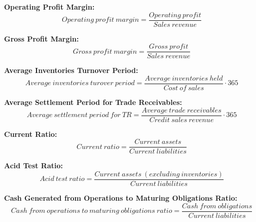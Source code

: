 \documentclass{report}
\newenvironment{blackbox}[1][Black]
  {\begin{tcolorbox}[colframe=#1,colback=white]}
  {\end{tcolorbox}}
\begin{document}
\begin{blackbox}
    \textbf{Operating Profit Margin:}
    \begin{equation}
        Operating \: profit \: margin = \frac{Operating \: profit}{Sales \: revenue}
    \end{equation}
\end{blackbox}

\begin{blackbox}
    \textbf{Gross Profit Margin:}
    \begin{equation}
        Gross \: profit \: margin = \frac{Gross \: profit}{Sales \: revenue}
    \end{equation}
\end{blackbox}

\begin{blackbox}
    \textbf{Average Inventories Turnover Period:}
    \begin{equation}
        Average \: inventories \: turover \: period = \frac{Average \: inventories \: held}{Cost \: of \: sales} \cdot 365
    \end{equation}
\end{blackbox}

\begin{blackbox}
    \textbf{Average Settlement Period for Trade Receivables:}
    \begin{equation}
        Average \: settlement \: period \: for \: TR = \frac{Average \: trade \: receivables}{Credit \: sales \: revenue} \cdot 365
    \end{equation}
\end{blackbox}

\begin{blackbox}
    \textbf{Current Ratio:}
    \begin{equation}
        Current \: ratio = \frac{Current \: assets}{Current \: liabilities}
    \end{equation}
\end{blackbox}

\begin{blackbox}
    \textbf{Acid Test Ratio:}
    \begin{equation}
        Acid \: test \: ratio = \frac{Current \: assets \: (excluding \: inventories)}{Current \: liabilities}
    \end{equation}
\end{blackbox}

\begin{blackbox}
    \textbf{Cash Generated from Operations to Maturing Obligations Ratio:}
    \begin{equation}
        Cash \: from \: operations \: to \: maturing \: obligations \: ratio = \frac{Cash \: from \: obligations}{Current \: liabilities}
    \end{equation}
\end{blackbox}
\end{document}
